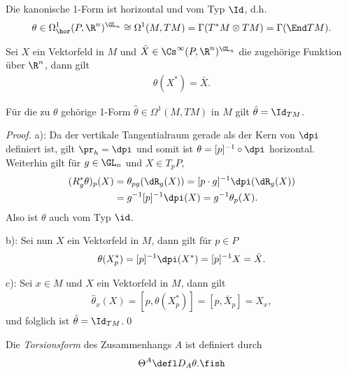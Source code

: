 \documentclass[%
	paper=a5,%
	fleqn,%
	DIV=18,%
	BCOR=0mm,
	fontsize=11pt,
	titlepage=false,%
	bibliography=totoc,
	DIV=18,%
	twoside=true,
	pdftitle=Riemannsche Geometrie,
	pdfauthor=Uwe Semmelmann,
	numbers=noendperiod]%
	{scrbook}
\begin{document}
\begin{lem}
\begin{propenum}
\item Die kanonische 1-Form ist horizontal und vom Typ $\Id$, d.h.
\begin{align*}
\theta\in \Omega^1_\hor(P,\R^n)^{\GL_n}\cong \Omega^1(M,TM) =
\Gamma(T^*M\otimes TM) = \Gamma(\End TM).
\end{align*}
\item Sei $X$ ein Vektorfeld in $M$ und $\bar{X}\in \Cs^\infty(P,\R^n)^{\GL_n}$
die zugehörige Funktion über $\R^n$, dann gilt
\begin{align*}
\theta(X^*) = \bar{X}.
\end{align*}
\item Für die zu $\theta$ gehörige 1-Form $\hat{\theta}\in\Omega^1(M,TM)$
in $M$ gilt $\hat{\theta} = \Id_{TM}$.\fish
\end{propenum}
\end{lem}
\begin{proof}
a): Da der vertikale Tangentialraum gerade als der Kern von $\dpi$ definiert
ist, gilt $\pr_h = \dpi$ und somit ist $\theta=[p]^{-1}\circ\dpi$ horizontal.
Weiterhin gilt für $g\in \GL_n$ und $X\in T_pP$,
\begin{align*}
(R_g^*\theta)_p(X) &= \theta_{pg}(\dR_g(X)) = [p\cdot g]^{-1}\dpi(\dR_g(X))\\
&= g^{-1}[p]^{-1}\dpi(X)
= g^{-1}\theta_p(X).
\end{align*}
Also ist $\theta$ auch vom Typ $\id$.

b): Sei nun $X$ ein Vektorfeld in $M$, dann gilt für $p\in P$
\begin{align*}
\theta(X^*_p) = [p]^{-1}\dpi(X^*) = [p]^{-1} X = \bar{X}.
\end{align*}

c): Sei $x\in M$ und $X$ ein Vektorfeld in $M$, dann gilt
\begin{align*}
\hat{\theta}_x(X) = [p,\theta(X^*_p)] = 
[p,\bar{X}_p] = X_x,
\end{align*} 
und folglich ist $\hat{\theta}=\Id_{TM}$.\qed
\end{proof}

\begin{defn}
Die \emph{Torsionsform} des Zusammenhangs $A$ ist definiert durch
\begin{align*}
\Theta^A \defl D_A \theta.\fish
\end{align*}
\end{defn}
\end{document}
